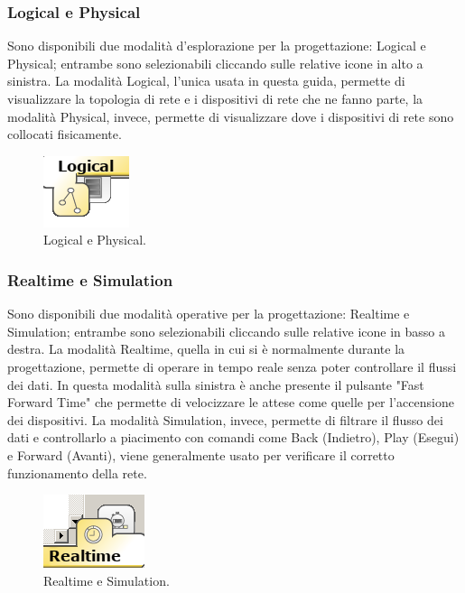 \subsubsection{Logical e Physical}
Sono disponibili due modalità d'esplorazione per la progettazione: Logical e Physical; entrambe sono selezionabili cliccando sulle relative icone in alto a sinistra. La modalità Logical, l'unica usata in questa guida, permette di visualizzare la topologia di rete e i dispositivi di rete che ne fanno parte, la modalità Physical, invece, permette di visualizzare dove i dispositivi di rete sono collocati fisicamente.

\begin{figure}[htbp]
    \centering
    \includegraphics[scale=.6]{images/02.packet-tracer/logical_physical.png}
    \caption{Logical e Physical.}
\end{figure}

\subsubsection{Realtime e Simulation}
Sono disponibili due modalità operative per la progettazione: Realtime e Simulation; entrambe sono selezionabili cliccando sulle relative icone in basso a destra. La modalità Realtime, quella in cui si è normalmente durante la progettazione, permette di operare in tempo reale senza poter controllare il flussi dei dati. In questa modalità sulla sinistra è anche presente il pulsante "Fast Forward Time" che permette di velocizzare le attese come quelle per l'accensione dei dispositivi. La modalità Simulation, invece, permette di filtrare il flusso dei dati e controllarlo a piacimento con comandi come Back (Indietro), Play (Esegui) e Forward (Avanti), viene generalmente usato per verificare il corretto funzionamento della rete. 

\begin{figure}[htbp]
    \centering
    \includegraphics[scale=.5]{images/02.packet-tracer/realtime_simulation.png}
    \caption{Realtime e Simulation.}
\end{figure}

